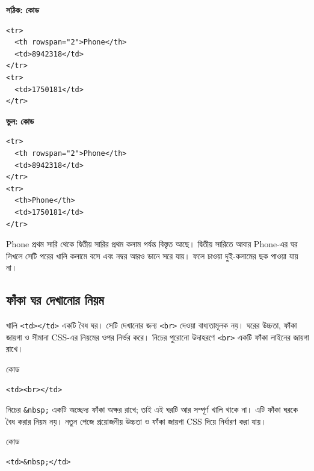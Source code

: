 \par\noindent
\begin{minipage}[t]{.50\linewidth}\vspace{0pt}\small
\textbf{সঠিক:}
\textbf{\color{chFourTeal}কোড}\par
\begin{verbatim}
<tr>
  <th rowspan="2">Phone</th>
  <td>8942318</td>
</tr>
<tr>
  <td>1750181</td>
</tr>
\end{verbatim}
\par\smallskip
\end{minipage}\hfill
\begin{minipage}[t]{.46\linewidth}\vspace{0pt}\small
\textbf{ভুল:}
\textbf{\color{chFourTeal}কোড}\par
\begin{verbatim}
<tr>
  <th rowspan="2">Phone</th>
  <td>8942318</td>
</tr>
<tr>
  <th>Phone</th>
  <td>1750181</td>
</tr>
\end{verbatim}
\par\smallskip
\end{minipage}\par


Phone প্রথম সারি থেকে দ্বিতীয় সারির প্রথম কলাম পর্যন্ত বিস্তৃত আছে। দ্বিতীয় সারিতে আবার Phone-এর ঘর লিখলে সেটি পরের খালি কলামে বসে এবং নম্বর আরও ডানে সরে যায়। ফলে চাওয়া দুই-কলামের ছক পাওয়া যায় না।

\subsection{ফাঁকা ঘর দেখানোর নিয়ম}

খালি \texttt{<td></td>} একটি বৈধ ঘর। সেটি দেখানোর জন্য \texttt{<br>} দেওয়া বাধ্যতামূলক নয়। ঘরের উচ্চতা, ফাঁকা জায়গা ও সীমানা CSS-এর নিয়মের ওপর নির্ভর করে। নিচের পুরোনো উদাহরণে \texttt{<br>} একটি ফাঁকা লাইনের জায়গা রাখে।

\begin{examplebox}{কোড}
\begin{verbatim}
<td><br></td>
\end{verbatim}
\end{examplebox}

নিচের \texttt{\&nbsp;} একটি অচ্ছেদ্য ফাঁকা অক্ষর রাখে; তাই এই ঘরটি আর সম্পূর্ণ খালি থাকে না। এটি ফাঁকা ঘরকে বৈধ করার নিয়ম নয়। নতুন পেজে প্রয়োজনীয় উচ্চতা ও ফাঁকা জায়গা CSS দিয়ে নির্ধারণ করা যায়।

\begin{examplebox}{কোড}
\begin{verbatim}
<td>&nbsp;</td>
\end{verbatim}
\end{examplebox}

